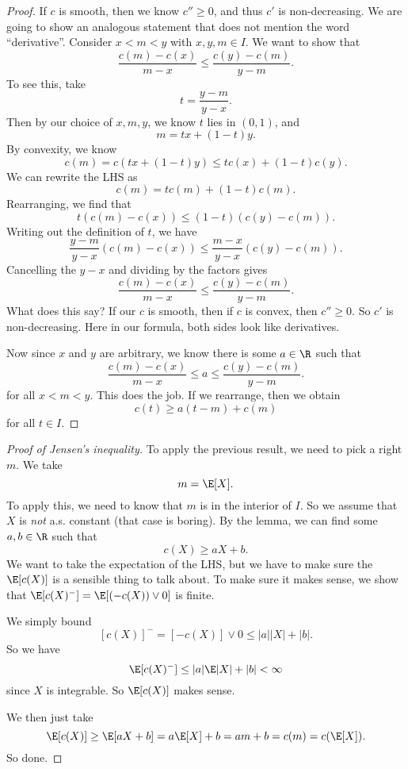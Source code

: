 \documentclass[a4paper]{article}
\begin{document}
\begin{proof}
  If $c$ is smooth, then we know $c'' \geq 0$, and thus $c'$ is non-decreasing. We are going to show an analogous statement that does not mention the word ``derivative''. Consider $x < m < y$ with $x, y, m \in I$. We want to show that
   \[
    \frac{c(m) - c(x)}{m - x} \leq \frac{c(y) - c(m)}{y - m}.
  \]
  To see this, take
  \[
    t = \frac{y - m}{y - x}.
  \]
  Then by our choice of $x, m , y$, we know $t$ lies in $(0, 1)$, and
  \[
    m = tx + (1 - t) y.
  \]
  By convexity, we know
  \[
    c(m) = c(tx + (1 - t) y) \leq tc(x) + (1 - t) c(y).
  \]
  We can rewrite the LHS as
  \[
    c(m) = t c(m) + (1 - t) c(m).
  \]
  Rearranging, we find that
  \[
    t (c(m) - c(x)) \leq (1 - t)(c(y) - c(m)).
  \]
  Writing out the definition of $t$, we have
  \[
    \frac{y - m}{y - x} (c(m) - c(x)) \leq \frac{m - x}{y - x} (c(y) - c(m)).
  \]
  Cancelling the $y - x$ and dividing by the factors gives
  \[
    \frac{c(m) - c(x)}{m - x} \leq \frac{c(y) - c(m)}{y - m}.
  \]
  What does this say? If our $c$ is smooth, then if $c$ is convex, then $c'' \geq 0$. So $c'$ is non-decreasing. Here in our formula, both sides look like derivatives.

  Now since $x$ and $y$ are arbitrary, we know there is some $a \in \R$ such that
  \[
    \frac{c(m) - c(x)}{m - x} \leq a \leq \frac{c(y) - c(m)}{y - m}.
  \]
  for all $x < m < y$. This does the job. If we rearrange, then we obtain
  \[
    c(t) \geq a(t - m) + c(m)
  \]
  for all $t \in I$.
\end{proof}

\begin{proof}[Proof of Jensen's inequality]
  To apply the previous result, we need to pick a right $m$. We take
  \[
    m = \E [X].
  \]
  To apply this, we need to know that $m$ is in the interior of $I$. So we assume that $X$ is \emph{not} a.s. constant (that case is boring). By the lemma, we can find some $a, b \in \R$ such that
  \[
    c(X) \geq aX + b.
  \]
  We want to take the expectation of the LHS, but we have to make sure the $\E[c(X)]$ is a sensible thing to talk about. To make sure it makes sense, we show that $\E[c(X)^-] = \E[(-c(X)) \vee 0]$ is finite.

  We simply bound
  \[
    [c(X)]^- = [-c(X)] \vee 0 \leq |a| |X| + |b|.
  \]
  So we have
  \[
    \E[c(X)^-] \leq |a| \E |X| + |b| < \infty
  \]
  since $X$ is integrable. So $\E[c(X)]$ makes sense.

  We then just take
  \[
    \E[c(X)] \geq \E[aX + b] = a\E[X] + b = am + b = c(m) = c(\E[X]).
  \]
  So done.
\end{proof}
\end{document}
